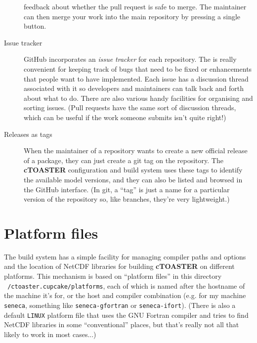 \documentclass[a4paper,10pt,article]{memoir}
\begin{document}
\begin{description}
{    feedback about whether the pull request is safe to merge.  The
    maintainer can then merge your work into the main repository by
    pressing a single button.}
  \item[Issue tracker]{GitHub incorporates an \emph{issue tracker} for
    each repository.  The is really convenient for keeping track of
    bugs that need to be fixed or enhancements that people want to
    have implemented.  Each issue has a discussion thread associated
    with it so developers and maintainers can talk back and forth
    about what to do.  There are also various handy facilities for
    organising and sorting issues.  (Pull requests have the same sort
    of discussion threads, which can be useful if the work someone
    submits isn't quite right!)}
  \item[Releases as tags]{When the maintainer of a repository wants to
    create a new official release of a package, they can just create a
    git tag on the repository.  The \textbf{cTOASTER} configuration and build
    system uses these tags to identify the available model versions,
    and they can also be listed and browsed in the GitHub interface.
    (In git, a ``tag'' is just a name for a particular version of the
    repository so, like branches, they're very lightweight.)}
\end{description}

\section{Platform files}
\label{sec:platforms}

The build system has a simple facility for managing compiler paths and
options and the location of NetCDF libraries for building \textbf{cTOASTER} on
different platforms.  This mechanism is based on ``platform files'' in
this directory \texttt{~/ctoaster.cupcake/platforms}, each of which is named
after the hostname of the machine it's for, or the host and compiler
combination (e.g. for my machine \texttt{seneca}, something like
\texttt{seneca-gfortran} or \texttt{seneca-ifort}).  (There is also a
default \texttt{LINUX} platform file that uses the GNU Fortran
compiler and tries to find NetCDF libraries in some ``conventional''
places, but that's really not all that likely to work in most
cases...)
\end{document}
